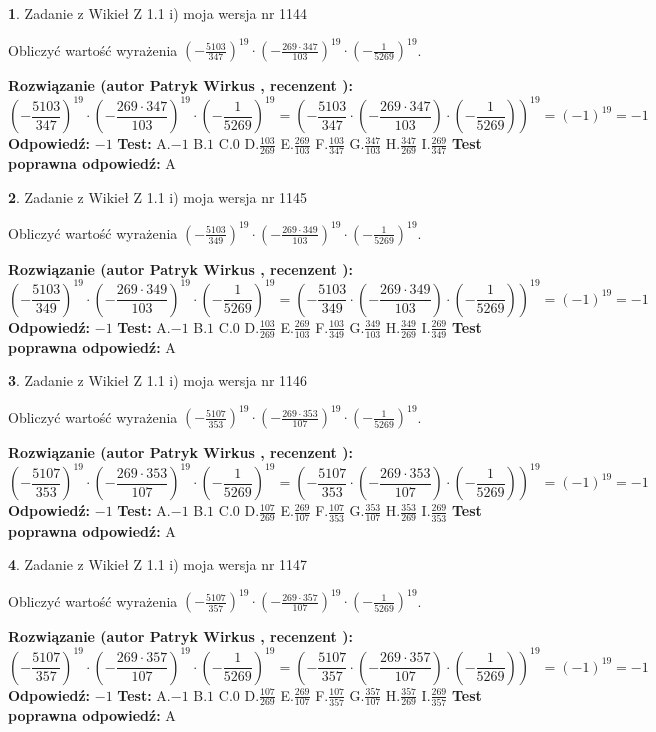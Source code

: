 \documentclass[12pt, a4paper]{article}
\theoremstyle{definition} %
\newtheorem{zad}{}
\newcommand{\zadStart}[1]{\begin{zad}#1\newline}
\newcommand{\zadStop}{\end{zad}}
\newcommand{\rozwStart}[2]{\noindent \textbf{Rozwiązanie (autor #1 , recenzent #2): }\newline}
\newcommand{\rozwStop}{\newline}
\newcommand{\odpStart}{\noindent \textbf{Odpowiedź:}\newline}
\newcommand{\odpStop}{\newline}
\newcommand{\testStart}{\noindent \textbf{Test:}\newline}
\newcommand{\testStop}{\newline}
\newcommand{\kluczStart}{\noindent \textbf{Test poprawna odpowiedź:}\newline}
\newcommand{\kluczStop}{\newline}
\begin{document}
\zadStart{Zadanie z Wikieł Z 1.1 i) moja wersja nr 1144}

Obliczyć wartość wyrażenia $(-\frac{5103}{347})^{19} \cdot (-\frac{269 \cdot 347}{103})^{19} \cdot (-\frac{1}{5269})^{19}$.
\zadStop
\rozwStart{Patryk Wirkus}{}
$$(-\frac{5103}{347})^{19} \cdot (-\frac{269 \cdot 347}{103})^{19} \cdot (-\frac{1}{5269})^{19} = (-\frac{5103}{347} \cdot (-\frac{269 \cdot 347}{103}) \cdot (-\frac{1}{5269}))^{19} = (-1)^{19} = -1$$
\rozwStop
\odpStart
$-1$
\odpStop
\testStart
A.$-1$ B.$1$ C.$0$ D.$\frac{103}{269}$ E.$\frac{269}{103}$
F.$\frac{103}{347}$ G.$\frac{347}{103}$
H.$\frac{347}{269}$
I.$\frac{269}{347}$
\testStop
\kluczStart
A
\kluczStop



\zadStart{Zadanie z Wikieł Z 1.1 i) moja wersja nr 1145}

Obliczyć wartość wyrażenia $(-\frac{5103}{349})^{19} \cdot (-\frac{269 \cdot 349}{103})^{19} \cdot (-\frac{1}{5269})^{19}$.
\zadStop
\rozwStart{Patryk Wirkus}{}
$$(-\frac{5103}{349})^{19} \cdot (-\frac{269 \cdot 349}{103})^{19} \cdot (-\frac{1}{5269})^{19} = (-\frac{5103}{349} \cdot (-\frac{269 \cdot 349}{103}) \cdot (-\frac{1}{5269}))^{19} = (-1)^{19} = -1$$
\rozwStop
\odpStart
$-1$
\odpStop
\testStart
A.$-1$ B.$1$ C.$0$ D.$\frac{103}{269}$ E.$\frac{269}{103}$
F.$\frac{103}{349}$ G.$\frac{349}{103}$
H.$\frac{349}{269}$
I.$\frac{269}{349}$
\testStop
\kluczStart
A
\kluczStop



\zadStart{Zadanie z Wikieł Z 1.1 i) moja wersja nr 1146}

Obliczyć wartość wyrażenia $(-\frac{5107}{353})^{19} \cdot (-\frac{269 \cdot 353}{107})^{19} \cdot (-\frac{1}{5269})^{19}$.
\zadStop
\rozwStart{Patryk Wirkus}{}
$$(-\frac{5107}{353})^{19} \cdot (-\frac{269 \cdot 353}{107})^{19} \cdot (-\frac{1}{5269})^{19} = (-\frac{5107}{353} \cdot (-\frac{269 \cdot 353}{107}) \cdot (-\frac{1}{5269}))^{19} = (-1)^{19} = -1$$
\rozwStop
\odpStart
$-1$
\odpStop
\testStart
A.$-1$ B.$1$ C.$0$ D.$\frac{107}{269}$ E.$\frac{269}{107}$
F.$\frac{107}{353}$ G.$\frac{353}{107}$
H.$\frac{353}{269}$
I.$\frac{269}{353}$
\testStop
\kluczStart
A
\kluczStop



\zadStart{Zadanie z Wikieł Z 1.1 i) moja wersja nr 1147}

Obliczyć wartość wyrażenia $(-\frac{5107}{357})^{19} \cdot (-\frac{269 \cdot 357}{107})^{19} \cdot (-\frac{1}{5269})^{19}$.
\zadStop
\rozwStart{Patryk Wirkus}{}
$$(-\frac{5107}{357})^{19} \cdot (-\frac{269 \cdot 357}{107})^{19} \cdot (-\frac{1}{5269})^{19} = (-\frac{5107}{357} \cdot (-\frac{269 \cdot 357}{107}) \cdot (-\frac{1}{5269}))^{19} = (-1)^{19} = -1$$
\rozwStop
\odpStart
$-1$
\odpStop
\testStart
A.$-1$ B.$1$ C.$0$ D.$\frac{107}{269}$ E.$\frac{269}{107}$
F.$\frac{107}{357}$ G.$\frac{357}{107}$
H.$\frac{357}{269}$
I.$\frac{269}{357}$
\testStop
\kluczStart
A
\kluczStop
\end{document}
